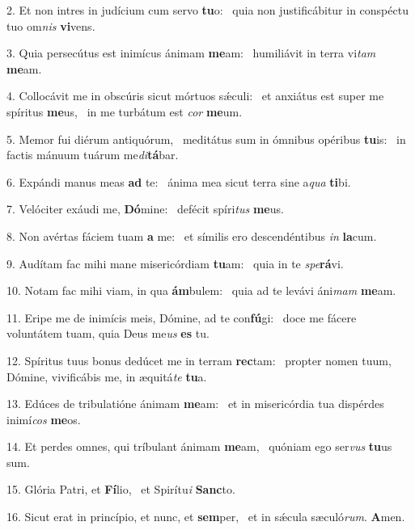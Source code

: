 2. Et non intres in judícium cum servo \textbf{tu}o: \ast\  quia non justificábitur in conspéctu tuo om\textit{nis} \textbf{vi}vens.\

3. Quia persecútus est inimícus ánimam \textbf{me}am: \ast\  humiliávit in terra vi\textit{tam} \textbf{me}am.\

4. Collocávit me in obscúris sicut mórtuos sǽculi: \dag\  et anxiátus est super me spíritus \textbf{me}us, \ast\  in me turbátum est \textit{cor} \textbf{me}um.\

5. Memor fui diérum antiquórum, \dag\  meditátus sum in ómnibus opéribus \textbf{tu}is: \ast\  in factis mánuum tuárum me\textit{di}\textbf{tá}bar.\

6. Expándi manus meas \textbf{ad} te: \ast\  ánima mea sicut terra sine a\textit{qua} \textbf{ti}bi.\

7. Velóciter exáudi me, \textbf{Dó}mine: \ast\  defécit spíri\textit{tus} \textbf{me}us.\

8. Non avértas fáciem tuam \textbf{a} me: \ast\  et símilis ero descendéntibus \textit{in} \textbf{la}cum.\

9. Audítam fac mihi mane misericórdiam \textbf{tu}am: \ast\  quia in te \textit{spe}\textbf{rá}vi.\

10. Notam fac mihi viam, in qua \textbf{ám}bulem: \ast\  quia ad te levávi áni\textit{mam} \textbf{me}am.\

11. Eripe me de inimícis meis, Dómine, ad te con\textbf{fú}gi: \ast\  doce me fácere voluntátem tuam, quia Deus me\textit{us} \textbf{es} tu.\

12. Spíritus tuus bonus dedúcet me in terram \textbf{rec}tam: \ast\  propter nomen tuum, Dómine, vivificábis me, in æquitá\textit{te} \textbf{tu}a.\

13. Edúces de tribulatióne ánimam \textbf{me}am: \ast\  et in misericórdia tua dispérdes inimí\textit{cos} \textbf{me}os.\

14. Et perdes omnes, qui tríbulant ánimam \textbf{me}am, \ast\  quóniam ego ser\textit{vus} \textbf{tu}us sum.\

15. Glória Patri, et \textbf{Fí}lio, \ast\  et Spirítu\textit{i} \textbf{Sanc}to.\

16. Sicut erat in princípio, et nunc, et \textbf{sem}per, \ast\  et in sǽcula sæculó\textit{rum}. \textbf{A}men.\

